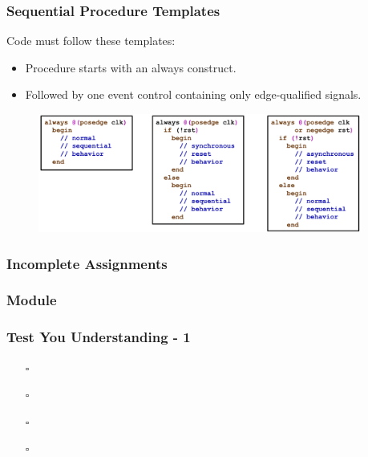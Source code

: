 \documentclass[t, notes, xcolor=table]{beamer}
\begin{document}
\begin{frame}
\frametitle{Sequential Procedure Templates}
Code must follow these templates:
\footnotesize{
\begin{itemize}
\item Procedure starts with an always construct.
\item Followed by one event control containing only edge-qualified signals.
\end{itemize}
}
\vfill
\begin{figure}
    \includegraphics[width=0.95\textwidth]{img/13_seq_template.png}
\end{figure}
\end{frame}

\begin{frame}
\frametitle{Incomplete Assignments}

\end{frame}
\note{
\scriptsize{


}
}

\begin{frame}
\frametitle{Module}

\end{frame}
\note{
\scriptsize{


}
}








\begin{frame}
\frametitle{Test You Understanding - 1}

\begin{itemize}
\item[$\square$] 
\item[$\square$] 
\item[$\square$] 
\item[$\square$] 
\end{itemize}
\end{frame}
\note{

}
\end{document}
